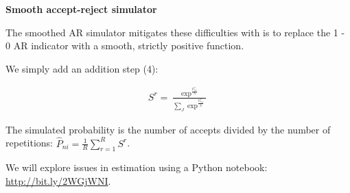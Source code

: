 \begin{frame}\textbf{Smooth accept-reject simulator}\vspace{0.3cm}

The smoothed AR simulator mitigates these difficulties with is to replace the 1 - 0 AR indicator with a smooth, strictly positive function.

We simply add an addition step (4):

\begin{align*}
  S^r = \frac{\exp^{\tfrac{U^r_{ni}}{\lambda}}}{\sum_J\exp^{\tfrac{U^r_{nj}}{\lambda}}}
\end{align*}

The simulated probability is the number of accepts divided by the number of repetitions: $\hat{P}_{ni} = \frac{1}{R} \sum^R_{r=1} S^r$.

\end{frame}


\begin{frame}

We will explore issues in estimation using a Python notebook: \url{http://bit.ly/2WGjWNI}.

\end{frame}

